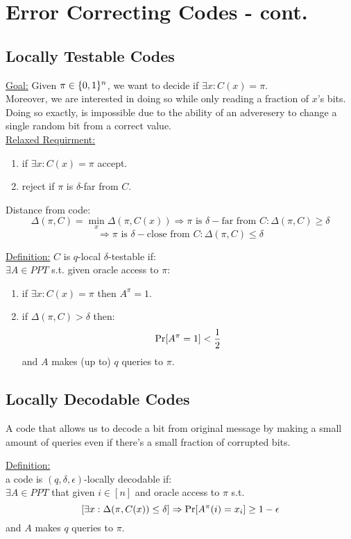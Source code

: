 \section*{Error Correcting Codes - cont.}
\subsection*{Locally Testable Codes}
\underline{Goal:}
Given $\pi\in\{0,1\}^n$, we want to decide if
$\exists x: C(x)=\pi$.\\
Moreover, we are interested in doing so
while only reading a fraction of $x$'s bits.\\
Doing so exactly, is impossible due to 
the ability of an adveresery to change a single random
bit from a correct value.\\

\underline{Relaxed Requirment:}
\begin{enumerate}
	\item if $\exists x: C(x)=\pi$ accept.
	\item reject if $\pi$ is $\delta$-far from $C$.
\end{enumerate}


Distance from code:
\[
	\Delta(\pi,C)=\min_x\Delta(\pi,C(x))
	\Rightarrow \pi \text{ is } \delta-\text{far from } C: \Delta(\pi,C)\geq \delta	
\]\[
	\Rightarrow \pi \text{ is } \delta-\text{close from } C: \Delta(\pi,C)\leq \delta
\]

\underline{Definition:}
$C$ is $q$-local $\delta$-testable if:\\
$\exists A\in PPT$ s.t.
given oracle access to $\pi$:
\begin{enumerate}
	\item if $\exists x: C(x)=\pi$ then $ A^\pi=1$.
	\item if $\Delta(\pi, C)>\delta$ then:
	\[
		\operatorname*{Pr}[A^\pi=1]<\frac{1}{2}
	\]
	and $A$ makes (up to) $q$ queries to $\pi$.
\end{enumerate}

\subsection*{Locally Decodable Codes}
A code that allows us to decode a bit from original message by
making a small amount of queries even if there's a small
fraction of corrupted bits.

\underline{Definition:}\\
a code is $(q,\delta,\epsilon)$-locally decodable if:\\
$\exists A\in PPT$ that given $i\in[n]$ and oracle access to $\pi$ s.t.\\
\[
	\left[\exists x: \Delta(\pi, C(x))\leq \delta\right]
	\Rightarrow \operatorname*{Pr}[A^\pi(i)=x_i]\geq 1-\epsilon	
\]
and $A$ makes $q$ queries to $\pi$.


